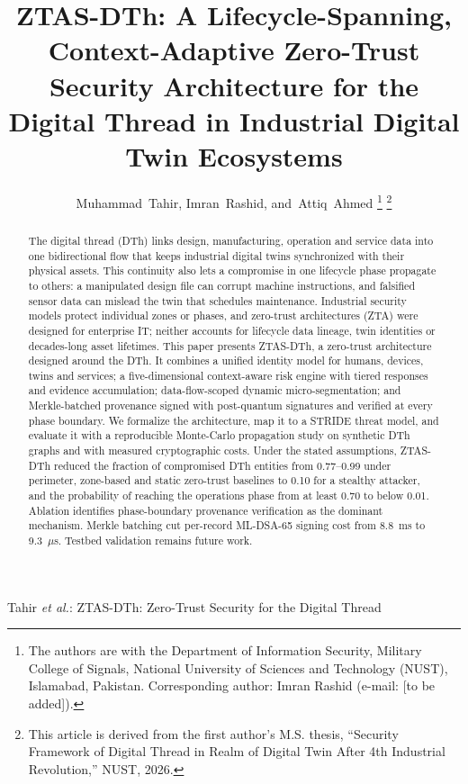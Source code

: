 \documentclass[journal]{IEEEtran}
\newcommand{\ztas}{ZTAS-DTh}
\begin{document}
\title{ZTAS-DTh: A Lifecycle-Spanning, Context-Adaptive Zero-Trust Security Architecture for the Digital Thread in Industrial Digital Twin Ecosystems}

\author{Muhammad~Tahir,
        Imran~Rashid,
        and~Attiq~Ahmed%
\thanks{The authors are with the Department of Information Security, Military College of Signals, National University of Sciences and Technology (NUST), Islamabad, Pakistan. Corresponding author: Imran Rashid (e-mail: [to be added]).}%
\thanks{This article is derived from the first author's M.S. thesis, ``Security Framework of Digital Thread in Realm of Digital Twin After 4th Industrial Revolution,'' NUST, 2026.}}

%
{Tahir \MakeLowercase{\textit{et al.}}: ZTAS-DTh: Zero-Trust Security for the Digital Thread}

\maketitle

\begin{abstract}
The digital thread (DTh) links design, manufacturing, operation and service data into one bidirectional flow that keeps industrial digital twins synchronized with their physical assets. This continuity also lets a compromise in one lifecycle phase propagate to others: a manipulated design file can corrupt machine instructions, and falsified sensor data can mislead the twin that schedules maintenance. Industrial security models protect individual zones or phases, and zero-trust architectures (ZTA) were designed for enterprise IT; neither accounts for lifecycle data lineage, twin identities or decades-long asset lifetimes. This paper presents \ztas{}, a zero-trust architecture designed around the DTh. It combines a unified identity model for humans, devices, twins and services; a five-dimensional context-aware risk engine with tiered responses and evidence accumulation; data-flow-scoped dynamic micro-segmentation; and Merkle-batched provenance signed with post-quantum signatures and verified at every phase boundary. We formalize the architecture, map it to a STRIDE threat model, and evaluate it with a reproducible Monte-Carlo propagation study on synthetic DTh graphs and with measured cryptographic costs. Under the stated assumptions, \ztas{} reduced the fraction of compromised DTh entities from 0.77--0.99 under perimeter, zone-based and static zero-trust baselines to 0.10 for a stealthy attacker, and the probability of reaching the operations phase from at least 0.70 to below 0.01. Ablation identifies phase-boundary provenance verification as the dominant mechanism. Merkle batching cut per-record ML-DSA-65 signing cost from 8.8~ms to 9.3~$\mu$s. Testbed validation remains future work.
\end{abstract}
\end{document}
